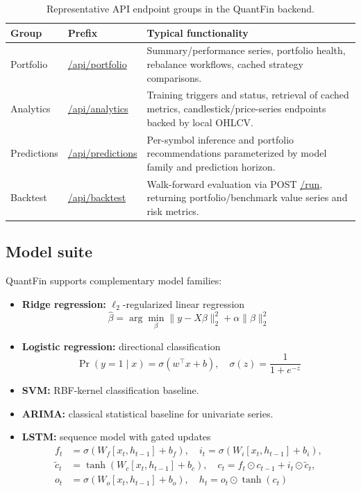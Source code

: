 \documentclass[conference]{IEEEtran}
\begin{document}
\begin{table}[!t]
\centering
\caption{Representative API endpoint groups in the QuantFin backend.}
\label{tab:api}
\small
\renewcommand{\arraystretch}{1.15}
\setlength{\tabcolsep}{6pt}
\begin{tabularx}{\textwidth}{|l|l|X|}
\hline
\textbf{Group} & \textbf{Prefix} & \textbf{Typical functionality}\\
\hline
Portfolio & \url{/api/portfolio} & Summary/performance series, portfolio health, rebalance workflows, cached strategy comparisons.\\
Analytics & \url{/api/analytics} & Training triggers and status, retrieval of cached metrics, candlestick/price-series endpoints backed by local OHLCV.\\
Predictions & \url{/api/predictions} & Per-symbol inference and portfolio recommendations parameterized by model family and prediction horizon.\\
Backtest & \url{/api/backtest} & Walk-forward evaluation via POST \url{/run}, returning portfolio/benchmark value series and risk metrics.\\
\hline
\end{tabularx}
\end{table}

\subsection{Model suite}
QuantFin supports complementary model families:
\begin{itemize}
\item \textbf{Ridge regression:} $\ell_2$-regularized linear regression
\begin{equation}
\hat{\beta} = \arg\min_{\beta} \|y - X\beta\|_2^2 + \alpha\|\beta\|_2^2
\end{equation}
\item \textbf{Logistic regression:} directional classification
\begin{equation}
\Pr(y=1\mid x)=\sigma(w^\top x+b),\quad \sigma(z)=\frac{1}{1+e^{-z}}
\end{equation}
\item \textbf{SVM:} RBF-kernel classification baseline.
\item \textbf{ARIMA:} classical statistical baseline for univariate series.
\item \textbf{LSTM:} sequence model with gated updates
\begin{align}
 f_t &= \sigma(W_f[x_t,h_{t-1}] + b_f),\quad i_t = \sigma(W_i[x_t,h_{t-1}] + b_i),\\
 \tilde{c}_t &= \tanh(W_c[x_t,h_{t-1}] + b_c),\quad c_t = f_t\odot c_{t-1} + i_t\odot \tilde{c}_t,\\
 o_t &= \sigma(W_o[x_t,h_{t-1}] + b_o),\quad h_t = o_t\odot \tanh(c_t)
\end{align}
\end{itemize}
\end{document}
